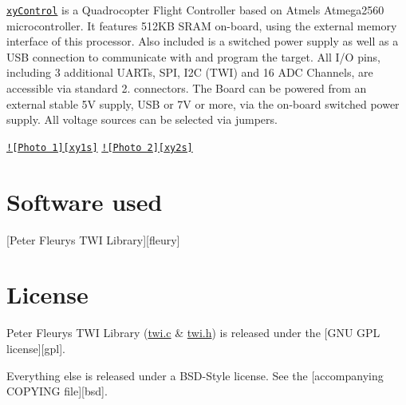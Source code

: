 

\href{http://www.xythobuz.de/xycontrol/}{\tt xy\-Control} is a Quadrocopter Flight Controller based on Atmels Atmega2560 microcontroller. It features 512\-K\-B S\-R\-A\-M on-\/board, using the external memory interface of this processor. Also included is a switched power supply as well as a U\-S\-B connection to communicate with and program the target. All I/\-O pins, including 3 additional U\-A\-R\-Ts, S\-P\-I, I2\-C (T\-W\-I) and 16 A\-D\-C Channels, are accessible via standard 2.\-54mm connectors. The Board can be powered from an external stable 5\-V supply, U\-S\-B or 7\-V or more, via the on-\/board switched power supply. All voltage sources can be selected via jumpers.

\href{http://www.xythobuz.de/img/xycontrol1.jpg}{\tt !\mbox{[}Photo 1\mbox{]}\mbox{[}xy1s\mbox{]}} \href{http://www.xythobuz.de/img/xycontrol2.jpg}{\tt !\mbox{[}Photo 2\mbox{]}\mbox{[}xy2s\mbox{]}}

\section*{Software used}


\begin{DoxyItemize}
\item \mbox{[}Peter Fleurys T\-W\-I Library\mbox{]}\mbox{[}fleury\mbox{]}
\end{DoxyItemize}

\section*{License}

Peter Fleurys T\-W\-I Library (\hyperlink{twi_8c_source}{twi.\-c} \& \hyperlink{twi_8h}{twi.\-h}) is released under the \mbox{[}G\-N\-U G\-P\-L license\mbox{]}\mbox{[}gpl\mbox{]}.

Everything else is released under a B\-S\-D-\/\-Style license. See the \mbox{[}accompanying C\-O\-P\-Y\-I\-N\-G file\mbox{]}\mbox{[}bsd\mbox{]}. 